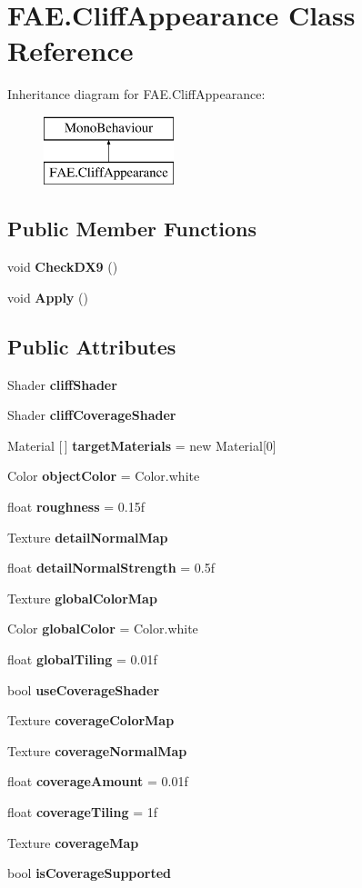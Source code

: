\section{F\+A\+E.\+Cliff\+Appearance Class Reference}
\label{class_f_a_e_1_1_cliff_appearance}
Inheritance diagram for F\+A\+E.\+Cliff\+Appearance\+:\begin{figure}[H]
\begin{center}
\leavevmode
\includegraphics[height=2.000000cm]{class_f_a_e_1_1_cliff_appearance}
\end{center}
\end{figure}
\subsection*{Public Member Functions}
\begin{DoxyCompactItemize}
\item 
void \textbf{ Check\+D\+X9} ()
\item 
void \textbf{ Apply} ()
\end{DoxyCompactItemize}
\subsection*{Public Attributes}
\begin{DoxyCompactItemize}
\item 
Shader \textbf{ cliff\+Shader}
\item 
Shader \textbf{ cliff\+Coverage\+Shader}
\item 
Material [$\,$] \textbf{ target\+Materials} = new Material[0]
\item 
Color \textbf{ object\+Color} = Color.\+white
\item 
float \textbf{ roughness} = 0.\+15f
\item 
Texture \textbf{ detail\+Normal\+Map}
\item 
float \textbf{ detail\+Normal\+Strength} = 0.\+5f
\item 
Texture \textbf{ global\+Color\+Map}
\item 
Color \textbf{ global\+Color} = Color.\+white
\item 
float \textbf{ global\+Tiling} = 0.\+01f
\item 
bool \textbf{ use\+Coverage\+Shader}
\item 
Texture \textbf{ coverage\+Color\+Map}
\item 
Texture \textbf{ coverage\+Normal\+Map}
\item 
float \textbf{ coverage\+Amount} = 0.\+01f
\item 
float \textbf{ coverage\+Tiling} = 1f
\item 
Texture \textbf{ coverage\+Map}
\item 
bool \textbf{ is\+Coverage\+Supported}
\end{DoxyCompactItemize}


